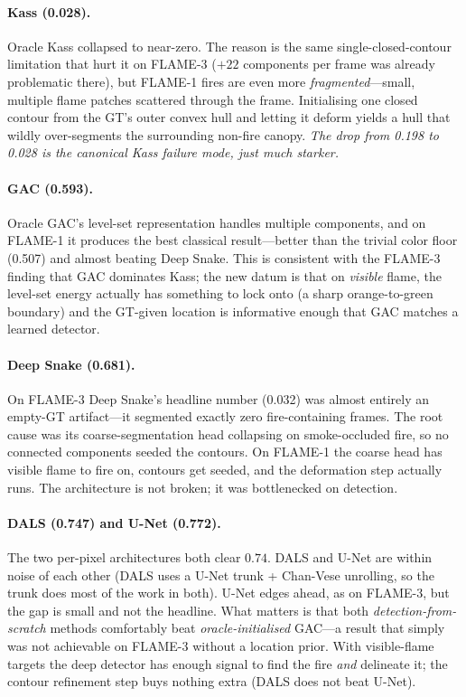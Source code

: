 \documentclass[10pt]{article}
\begin{document}
\paragraph{Kass (0.028).} Oracle Kass collapsed to near-zero. The reason is the
same single-closed-contour limitation that hurt it on FLAME-3 ($+22$ components
per frame was already problematic there), but FLAME-1 fires are even more
\emph{fragmented}---small, multiple flame patches scattered through the frame.
Initialising one closed contour from the GT's outer convex hull and letting it
deform yields a hull that wildly over-segments the surrounding non-fire
canopy. \emph{The drop from 0.198 to 0.028 is the canonical Kass failure mode,
just much starker.}

\paragraph{GAC (0.593).} Oracle GAC's level-set representation handles
multiple components, and on FLAME-1 it produces the best classical
result---better than the trivial color floor (0.507) and almost beating Deep
Snake. This is consistent with the FLAME-3 finding that GAC dominates Kass; the
new datum is that on \emph{visible} flame, the level-set energy actually has
something to lock onto (a sharp orange-to-green boundary) and the GT-given
location is informative enough that GAC matches a learned detector.

\paragraph{Deep Snake (0.681).} On FLAME-3 Deep Snake's headline number
(0.032) was almost entirely an empty-GT artifact---it segmented exactly zero
fire-containing frames. The root cause was its coarse-segmentation head
collapsing on smoke-occluded fire, so no connected components seeded the
contours. On FLAME-1 the coarse head has visible flame to fire on, contours
get seeded, and the deformation step actually runs. The architecture is
not broken; it was bottlenecked on detection.

\paragraph{DALS (0.747) and U-Net (0.772).} The two per-pixel architectures
both clear $0.74$. DALS and U-Net are within noise of each other (DALS uses a
U-Net trunk + Chan-Vese unrolling, so the trunk does most of the work in both).
U-Net edges ahead, as on FLAME-3, but the gap is small and not the headline.
What matters is that both \emph{detection-from-scratch} methods comfortably
beat \emph{oracle-initialised} GAC---a result that simply was not achievable
on FLAME-3 without a location prior. With visible-flame targets the deep
detector has enough signal to find the fire \emph{and} delineate it; the
contour refinement step buys nothing extra (DALS does not beat U-Net).
\end{document}
